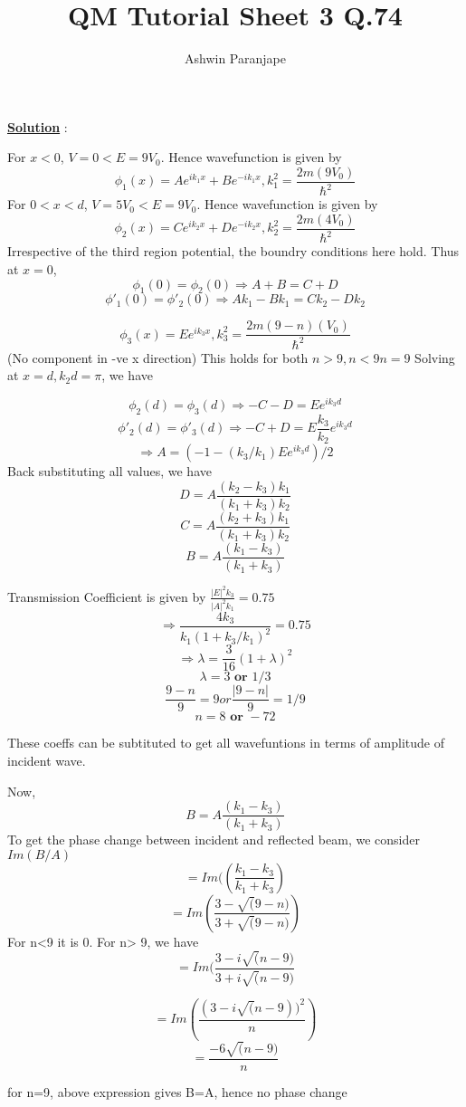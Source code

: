 \documentclass{article}
\begin{document}
\title{QM Tutorial Sheet 3 Q.74}
\author{Ashwin Paranjape}
\maketitle



{\underline {\bf Solution}} : \\
\begin{center}
\end{center}

For $x<0$, $V=0 < E = 9V_0$. Hence wavefunction is given by
\[\phi_{1}(x)=Ae^{ik_1x}+Be^{-ik_1x}, k_1^2= \frac{2m(9V_0)}{\hbar^2}\]
For $0<x<d$, $V=5V_0 < E = 9V_0$. Hence wavefunction is given by
\[\phi_{2}(x)=Ce^{ik_2x}+De^{-ik_2x}, k_2^2= \frac{2m(4V_0)}{\hbar^2}\]
Irrespective of the third region potential, the boundry conditions here hold.
Thus at $x=0$, 
\[\phi_{1}(0) = \phi_{2}(0) \Rightarrow A+B=C+D\]
\[\phi'_{1}(0) = \phi'_{2}(0) \Rightarrow Ak_1-Bk_1=Ck_2 - Dk_2\]


\[\phi_{3}(x)=Ee^{ik_3x}, k_3^2= \frac{2m(9-n)(V_0)}{\hbar^2}\] (No component in -ve x direction)
This holds for both $n>9, n<9 n = 9$
Solving at $x=d, k_2d=\pi$, we have

\[\phi_{2}(d) = \phi_{3}(d) \Rightarrow -C-D=Ee^{ik_3d}\]
\[\phi'_{2}(d) = \phi'_{3}(d) \Rightarrow - C + D = E\frac{k_3}{k_2}e^{ik_3d} \]
\[\Rightarrow A = (-1-(k_3/k_1)E e^{ik_3d})/2\]
Back substituting all values, we have
\[D = A \frac{(k_2 - k_3)k_1}{(k_1+k_3)k_2}\]
\[C = A \frac{(k_2 + k_3)k_1}{(k_1+k_3)k_2}\]
\[B = A \frac{(k_1 - k_3)}{(k_1+k_3)}\]

Transmission Coefficient is given by $\frac{|E|^2k_3}{|A|^2k_1} = 0.75 $
\[\Rightarrow \frac{4k_3}{k_1(1+k_3/k_1)^2} = 0.75\]
\[\Rightarrow \lambda=\frac{3}{16} (1+\lambda)^2\]
\[ \lambda = 3 \textbf{ or } 1/3\]
\[ \frac{9-n}{9}= 9 or \frac {|9-n|}{9} = 1/9\]
\[ n=8 \textbf{ or } -72 \]

These coeffs can be subtituted to get all wavefuntions in terms of amplitude of incident wave.

Now,
\[B = A \frac{(k_1 - k_3)}{(k_1+k_3)}\]
To get the phase change between incident and reflected beam, we consider $Im(B/A)$
\[= Im ((\frac{k_1-k_3}{k_1+k_3})\]
\[= Im( \frac{3-\sqrt(9-n)}{3+\sqrt(9-n)})\]
For n<9 it is 0. For n> 9, we have
\[= Im(\frac{3 - i\sqrt(n-9)}{3 + i\sqrt(n-9)}\]

\[= Im (\frac{(3-i\sqrt(n-9))^2}{n})\]
\[= \frac{-6\sqrt(n-9)}{n}\]

for n=9, above expression gives B=A, hence no phase change
\end{document}
